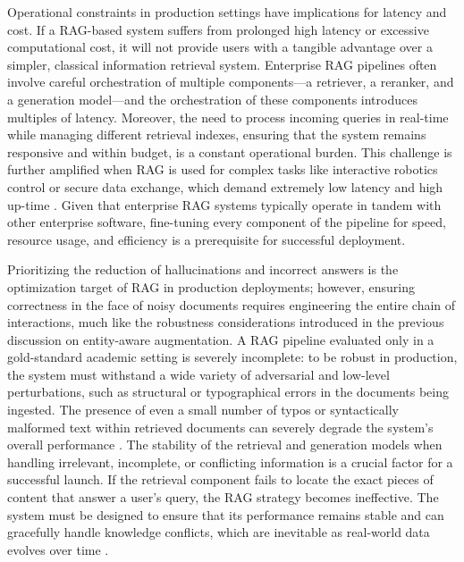 \documentclass[11pt]{article}
\begin{document}
Operational constraints in production settings have implications for latency and cost. If a RAG-based system suffers from prolonged high latency or excessive computational cost, it will not provide users with a tangible advantage over a simpler, classical information retrieval system. Enterprise RAG pipelines often involve careful orchestration of multiple components---a retriever, a reranker, and a generation model---and the orchestration of these components introduces multiples of latency. Moreover, the need to process incoming queries in real-time while managing different retrieval indexes, ensuring that the system remains responsive and within budget, is a constant operational burden. This challenge is further amplified when RAG is used for complex tasks like interactive robotics control or secure data exchange, which demand extremely low latency and high up-time \cite{ref224}. Given that enterprise RAG systems typically operate in tandem with other enterprise software, fine-tuning every component of the pipeline for speed, resource usage, and efficiency is a prerequisite for successful deployment.

Prioritizing the reduction of hallucinations and incorrect answers is the optimization target of RAG in production deployments; however, ensuring correctness in the face of noisy documents requires engineering the entire chain of interactions, much like the robustness considerations introduced in the previous discussion on entity-aware augmentation. A RAG pipeline evaluated only in a gold-standard academic setting is severely incomplete: to be robust in production, the system must withstand a wide variety of adversarial and low-level perturbations, such as structural or typographical errors in the documents being ingested. The presence of even a small number of typos or syntactically malformed text within retrieved documents can severely degrade the system's overall performance \cite{ref97}. The stability of the retrieval and generation models when handling irrelevant, incomplete, or conflicting information is a crucial factor for a successful launch. If the retrieval component fails to locate the exact pieces of content that answer a user's query, the RAG strategy becomes ineffective. The system must be designed to ensure that its performance remains stable and can gracefully handle knowledge conflicts, which are inevitable as real-world data evolves over time \cite{ref9}.
\end{document}
